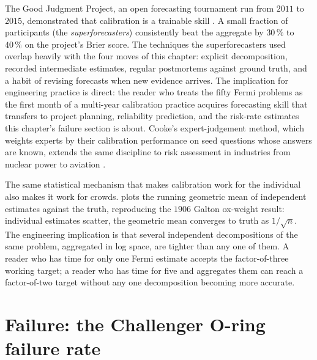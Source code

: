 

\begin{mastery}
The Good Judgment Project, an open forecasting tournament run from
$2011$ to $2015$, demonstrated that calibration is a trainable skill
\cite{text:ch09-tetlock-superforecasting-2015}. A small fraction of
participants (the \emph{superforecasters}) consistently beat the
aggregate by $30\,\%$ to $40\,\%$ on the project's Brier score. The
techniques the superforecasters used overlap heavily with the four
moves of this chapter: explicit decomposition, recorded
intermediate estimates, regular postmortems against ground truth,
and a habit of revising forecasts when new evidence arrives. The
implication for engineering practice is direct: the reader who
treats the fifty Fermi problems as the first month of a
multi-year calibration practice acquires forecasting skill that
transfers to project planning, reliability prediction, and the
risk-rate estimates this chapter's failure section is about.
Cooke's expert-judgement method, which weights experts by their
calibration performance on seed questions whose answers are known,
extends the same discipline to risk assessment in industries from
nuclear power to aviation \cite{paper:ch09-cooke-expert-2008}.
\end{mastery}

The same statistical mechanism that makes calibration work for the
individual also makes it work for crowds.
 plots the running geometric
mean of independent estimates against the truth, reproducing the
$1906$ Galton ox-weight result: individual estimates scatter, the
geometric mean converges to truth as $1/\sqrt{n}$. The engineering
implication is that several independent decompositions of the same
problem, aggregated in log space, are tighter than any one of them.
A reader who has time for only one Fermi estimate accepts the
factor-of-three working target; a reader who has time for five and
aggregates them can reach a factor-of-two target without any one
decomposition becoming more accurate.



\section{Failure: the Challenger O-ring failure rate}

